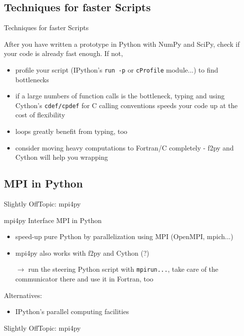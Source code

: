 \subsection{Techniques for faster Scripts}

\begin{frame}{Techniques for faster Scripts}

After you have written a prototype in Python with NumPy and SciPy,
check if your code is already fast enough. If not,

\begin{itemize}
    \item profile your script (IPython's {\texttt{run -p}} or
    {\texttt{cProfile}} module...) to find bottlenecks
    \item if a large numbers of function calls is the bottleneck,
    typing and using  Cython's {\texttt{cdef/cpdef}} for C calling
    conventions speeds your code up at the cost of flexibility
    \item loops greatly benefit from typing, too
    \item consider moving heavy computations to Fortran/C completely -
    f2py and Cython will help you wrapping
\end{itemize}

\end{frame}


\subsection{MPI in Python}

\begin{frame}{Slightly OffTopic: mpi4py}

\begin{exbox}{mpi4py}
    Interface MPI in Python
\end{exbox}

\begin{itemize}
    \item speed-up pure Python by parallelization using MPI (OpenMPI, mpich...)
    \item mpi4py also works with f2py and Cython (?)
    \item[$\rightarrow$] run the steering Python script with
    {\texttt{mpirun...}}, take care of the communicator there and use
    it in Fortran, too
\end{itemize}

Alternatives:

\begin{itemize}
    \item IPython's parallel computing facilities
\end{itemize}

\end{frame}


\begin{frame}[fragile]{Slightly OffTopic: mpi4py}



\end{frame}
